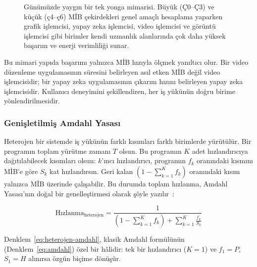 \begin{figure}[H]
\caption[Günümüz tek yonga blok diyagramı]{Günümüzde yaygın bir tek yonga mimarisi. Büyük (Ç0--Ç3) ve küçük (ç4--ç6) MİB çekirdekleri genel amaçlı hesaplama yaparken grafik işlemcisi, yapay zeka işlemcisi, video işlemcisi ve görüntü işlemcisi gibi birimler kendi uzmanlık alanlarında çok daha yüksek başarım ve enerji verimliliği sunar.}
\label{fig:soc-blok}
\end{figure}

Bu mimari yapıda başarımı yalnızca MİB hızıyla ölçmek yanıltıcı olur. Bir video düzenleme uygulamasının süresini belirleyen asıl etken MİB değil video işlemcisidir; bir yapay zeka uygulamasının çıkarım hızını belirleyen yapay zeka işlemcisidir. Kullanıcı deneyimini şekillendiren, her iş yükünün doğru birime yönlendirilmesidir.

\subsubsection*{Genişletilmiş Amdahl Yasası}

Heterojen bir sistemde iş yükünün farklı kısımları farklı birimlerde yürütülür. Bir programın toplam yürütme zamanı $T$ olsun. Bu programın $K$ adet hızlandırıcıya dağıtılabilecek kısımları olsun: $k$'ıncı hızlandırıcı, programın $f_k$ oranındaki kısmını MİB'e göre $S_k$ kat hızlandırsın. Geri kalan $(1 - \sum_{k=1}^{K} f_k)$ oranındaki kısım yalnızca MİB üzerinde çalışabilir. Bu durumda toplam hızlanma, Amdahl Yasası'nın doğal bir genelleştirmesi olarak şöyle yazılır~\cite{hill2008}:

\begin{equation}
\text{Hızlanma}_{\text{heterojen}} = \frac{1}{\displaystyle \left(1 - \sum_{k=1}^{K} f_k\right) + \sum_{k=1}^{K} \frac{f_k}{S_k}}
\label{eq:heterojen-amdahl}
\end{equation}

\noindent Denklem~\ref{eq:heterojen-amdahl}, klasik Amdahl formülünün (Denklem~\ref{eq:amdahl}) özel bir hâlidir: tek bir hızlandırıcı ($K = 1$) ve $f_1 = P$, $S_1 = H$ alınırsa özgün biçime dönüşür.

